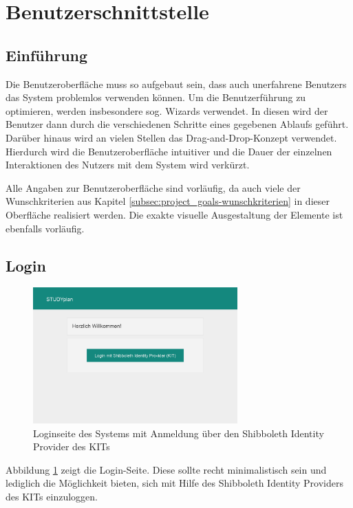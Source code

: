 \section{Benutzerschnittstelle}

\subsection{Einführung}
Die Benutzeroberfläche muss so aufgebaut sein, dass auch unerfahrene \glspl{Benutzer} das System problemlos verwenden können.
Um die Benutzerführung zu optimieren, werden insbesondere sog. \glspl{Wizard} verwendet. In diesen wird der Benutzer dann durch die verschiedenen Schritte eines gegebenen Ablaufs geführt. Darüber hinaus wird an vielen Stellen das \gls{Drag-and-Drop}-Konzept verwendet.
Hierdurch wird die Benutzeroberfläche intuitiver und die Dauer der einzelnen Interaktionen des Nutzers mit dem System wird verkürzt.

Alle Angaben zur Benutzeroberfläche sind vorläufig, da auch viele der Wunschkriterien aus Kapitel \ref{subsec:project_goals-wunschkriterien} in dieser Oberfläche realisiert werden. Die exakte visuelle Ausgestaltung der Elemente ist ebenfalls vorläufig.
\subsection{Login}
\begin{figure}[!htb]
	\caption{Loginseite des Systems mit Anmeldung über den \gls{Shibboleth Identity Provider} des \gls{KIT}s}
	\label{fig:gui-login-1}
	\centering
	\includegraphics[width=0.7\textwidth]{../GUI/ergebnisse/login-1.png}
\end{figure}
Abbildung \ref{fig:gui-login-1} zeigt die Login-Seite. Diese sollte recht minimalistisch sein und lediglich die Möglichkeit bieten, sich mit Hilfe des \gls{Shibboleth Identity Provider}s des \gls{KIT}s einzuloggen.

